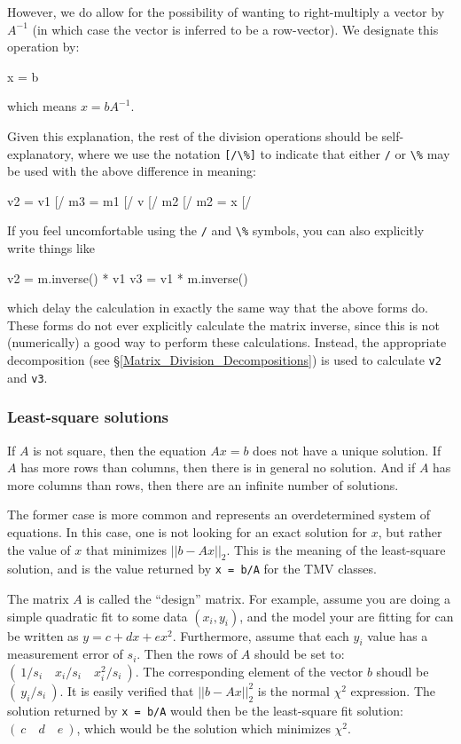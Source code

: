 \documentclass[twoside,letterpaper,11pt]{article}
\renewcommand{\tt}[1]{{\lstinline {#1}}}
\begin{document}
However, we do allow for the possibility of wanting to right-multiply a vector
by $A^{-1}$ (in which case the vector is inferred to be a row-vector).  We designate
this operation by:
\begin{tmvcode}
x = b %
\end{tmvcode}
which means $x = b A^{-1}$.

Given this explanation, the rest of the division operations should be self-explanatory,
where we use the notation \tt{[/\%]} to indicate that either \tt{/} or \tt{\%} may
be used with the above difference in meaning:
\begin{tmvcode}
v2 = v1 [/%
m3 = m1 [/%
v [/%
m2 [/%
m2 = x [/%
\end{tmvcode}

If you feel uncomfortable using the \tt{/} and \tt{\%} symbols,
you can also explicitly write things like
\begin{tmvcode}
v2 = m.inverse() * v1
v3 = v1 * m.inverse()
\end{tmvcode}
which delay the calculation in exactly the same way that the above forms do.  
These forms
do not ever explicitly calculate the matrix inverse, since this is not (numerically) a
good way to perform these calculations.  Instead, the appropriate decomposition 
(see \S\ref{Matrix_Division_Decompositions})
is used to calculate \tt{v2} and \tt{v3}.

\subsubsection{Least-square solutions}
\label{Matrix_Division_Leastsquare}

If $A$ is not square, then the equation $A x = b$ does not have a unique solution.
If $A$ has more rows than columns, then there is in general no solution.
And if $A$ has more columns than rows, then there are an infinite 
number of solutions.  

The former case is more common and represents an overdetermined system of 
equations.  In this case, one is not looking for an exact solution
for $x$, but rather the value of $x$ that minimizes $||b - A x||_2$.  This is the 
meaning of the least-square
solution, and is the value returned by \tt{x = b/A} for the TMV classes.  

The matrix $A$ is called the ``design'' matrix.  For example, assume you are doing
a simple quadratic fit to some data $(x_i,y_i)$, and the model your are fitting for
can be written as
$y = c + dx + ex^2$.  Furthermore, assume that each
$y_i$ value has a measurement error of $s_i$.  Then the rows of $A$ should
be set to: $( ~1/s_i \quad x_i/s_i \quad x_i^2/s_i ~ )$.  The corresponding
element of the vector $b$ shoudl be $( ~ y_i/s_i ~ )$.  It is easily verified that
$||b-Ax||_2^2$ is the normal $\chi^2$ expression.
The solution returned by
\tt{x = b/A} would then be the least-square fit solution: $(~c \quad d \quad e~)$,
which would be the solution which minimizes $\chi^2$.
\end{document}
